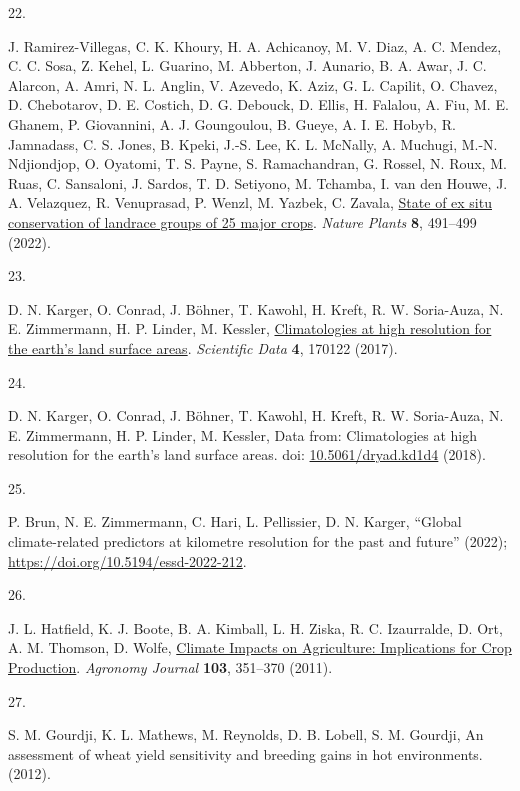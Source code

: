 \documentclass[
  letterpaper,
  DIV=11,
  numbers=noendperiod]{scrartcl}
\newlength{\cslhangindent}
\newlength{\csllabelwidth}
\newenvironment{CSLReferences}[2] %
 {\begin{list}{}{%
  \setlength{\itemindent}{0pt}
  \setlength{\leftmargin}{0pt}
  \setlength{\parsep}{0pt}
  \ifodd #1
   \setlength{\leftmargin}{\cslhangindent}
   \setlength{\itemindent}{-1\cslhangindent}
  \fi
  \setlength{\itemsep}{#2\baselineskip}}}
 {\end{list}}
\newcommand{\CSLLeftMargin}[1]{\parbox[t]{\csllabelwidth}{\strut#1\strut}}
\newcommand{\CSLRightInline}[1]{\parbox[t]{\linewidth - \csllabelwidth}{\strut#1\strut}}
\begin{document}
\begin{CSLReferences}{0}{1}
\CSLLeftMargin{22. }%
\CSLRightInline{J. Ramirez-Villegas, C. K. Khoury, H. A. Achicanoy, M.
V. Diaz, A. C. Mendez, C. C. Sosa, Z. Kehel, L. Guarino, M. Abberton, J.
Aunario, B. A. Awar, J. C. Alarcon, A. Amri, N. L. Anglin, V. Azevedo,
K. Aziz, G. L. Capilit, O. Chavez, D. Chebotarov, D. E. Costich, D. G.
Debouck, D. Ellis, H. Falalou, A. Fiu, M. E. Ghanem, P. Giovannini, A.
J. Goungoulou, B. Gueye, A. I. E. Hobyb, R. Jamnadass, C. S. Jones, B.
Kpeki, J.-S. Lee, K. L. McNally, A. Muchugi, M.-N. Ndjiondjop, O.
Oyatomi, T. S. Payne, S. Ramachandran, G. Rossel, N. Roux, M. Ruas, C.
Sansaloni, J. Sardos, T. D. Setiyono, M. Tchamba, I. van den Houwe, J.
A. Velazquez, R. Venuprasad, P. Wenzl, M. Yazbek, C. Zavala,
\href{https://doi.org/10.1038/s41477-022-01144-8}{State of ex situ
conservation of landrace groups of 25 major crops}. \emph{Nature Plants}
\textbf{8}, 491--499 (2022).}

\CSLLeftMargin{23. }%
\CSLRightInline{D. N. Karger, O. Conrad, J. Böhner, T. Kawohl, H. Kreft,
R. W. Soria-Auza, N. E. Zimmermann, H. P. Linder, M. Kessler,
\href{https://doi.org/10.1038/sdata.2017.122}{Climatologies at high
resolution for the earth{'}s land surface areas}. \emph{Scientific Data}
\textbf{4}, 170122 (2017).}

\CSLLeftMargin{24. }%
\CSLRightInline{D. N. Karger, O. Conrad, J. Böhner, T. Kawohl, H. Kreft,
R. W. Soria-Auza, N. E. Zimmermann, H. P. Linder, M. Kessler, Data from:
Climatologies at high resolution for the earth's land surface areas.
doi: \href{https://doi.org/10.5061/dryad.kd1d4}{10.5061/dryad.kd1d4}
(2018).}

\CSLLeftMargin{25. }%
\CSLRightInline{P. Brun, N. E. Zimmermann, C. Hari, L. Pellissier, D. N.
Karger, {``Global climate-related predictors at kilometre resolution for
the past and future''} (2022);
\url{https://doi.org/10.5194/essd-2022-212}.}

\CSLLeftMargin{26. }%
\CSLRightInline{J. L. Hatfield, K. J. Boote, B. A. Kimball, L. H. Ziska,
R. C. Izaurralde, D. Ort, A. M. Thomson, D. Wolfe,
\href{https://doi.org/10.2134/agronj2010.0303}{Climate Impacts on
Agriculture: Implications for Crop Production}. \emph{Agronomy Journal}
\textbf{103}, 351--370 (2011).}

\CSLLeftMargin{27. }%
\CSLRightInline{S. M. Gourdji, K. L. Mathews, M. Reynolds, D. B. Lobell,
S. M. Gourdji, An assessment of wheat yield sensitivity and breeding
gains in hot environments. (2012).}


\end{CSLReferences}
\end{document}
